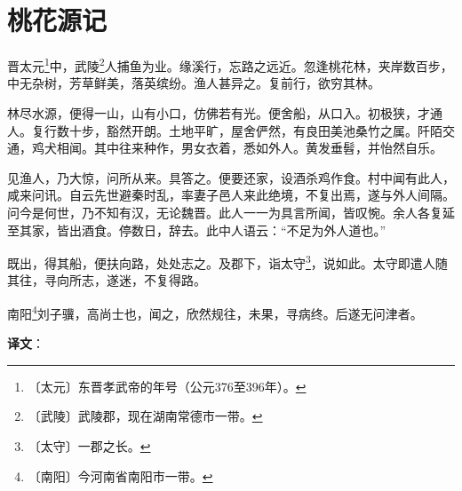 \documentclass[12pt,UTF-8,openany]{ctexbook}
\begin{document}
\chapter{桃花源记}

\begin{normalsize}
    
    晋太元\footnote{〔太元〕东晋孝武帝的年号（公元376至396年）。}中，武陵\footnote{〔武陵〕武陵郡，现在湖南常德市一带。}人捕鱼为业。缘溪行，忘路之远近。忽逢桃花林，夹岸数百步，中无杂树，芳草鲜美，落英缤纷。渔人甚异之。复前行，欲穷其林。
    
    林尽水源，便得一山，山有小口，仿佛若有光。便舍船，从口入。初极狭，才通人。复行数十步，豁然开朗。土地平旷，屋舍俨然，有良田美池桑竹之属。阡陌交通，鸡犬相闻。其中往来种作，男女衣着，悉如外人。黄发垂髫，并怡然自乐。
    
    见渔人，乃大惊，问所从来。具答之。便要还家，设酒杀鸡作食。村中闻有此人，咸来问讯。自云先世避秦时乱，率妻子邑人来此绝境，不复出焉，遂与外人间隔。问今是何世，乃不知有汉，无论魏晋。此人一一为具言所闻，皆叹惋。余人各复延至其家，皆出酒食。停数日，辞去。此中人语云：“不足为外人道也。”
    
    既出，得其船，便扶向路，处处志之。及郡下，诣太守\footnote{〔太守〕一郡之长。}，说如此。太守即遣人随其往，寻向所志，遂迷，不复得路。
    
    南阳\footnote{〔南阳〕今河南省南阳市一带。}刘子骥，高尚士也，闻之，欣然规往，未果，寻病终。后遂无问津者。
\end{normalsize}


\newpage

\textbf{译文}：

\vspace{1em}
\end{document}
